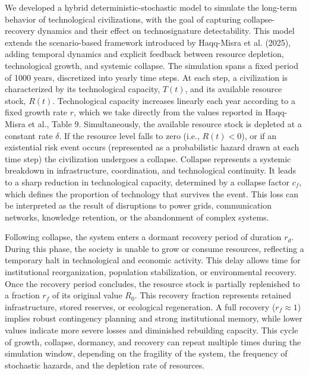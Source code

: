 We developed a hybrid deterministic-stochastic model to simulate the long-term behavior of technological civilizations, with the goal of capturing collapse-recovery dynamics and their effect on technosignature detectability. This model extends the scenario-based framework introduced by Haqq-Misra et al. (2025), adding temporal dynamics and explicit feedback between resource depletion, technological growth, and systemic collapse. The simulation spans a fixed period of 1000 years, discretized into yearly time steps. At each step, a civilization is characterized by its technological capacity, \(T(t)\), and its available resource stock, \(R(t)\). Technological capacity increases linearly each year according to a fixed growth rate \(r\), which we take directly from the values reported in Haqq-Misra et al., Table 9. Simultaneously, the available resource stock is depleted at a constant rate \(\delta\). If the resource level falls to zero (i.e., \(R(t) < 0\)), or if an existential risk event occurs (represented as a probabilistic hazard drawn at each time step) the civilization undergoes a collapse. Collapse represents a systemic breakdown in infrastructure, coordination, and technological continuity. It leads to a sharp reduction in technological capacity, determined by a collapse factor \(c_{f}\), which defines the proportion of technology that survives the event. This loss can be interpreted as the result of disruptions to power grids, communication networks, knowledge retention, or the abandonment of complex systems.

Following collapse, the system enters a dormant recovery period of duration \(r_{d}\). During this phase, the society is unable to grow or consume resources, reflecting a temporary halt in technological and economic activity. This delay allows time for institutional reorganization, population stabilization, or environmental recovery. Once the recovery period concludes, the resource stock is partially replenished to a fraction \(r_{f}\) of its original value \(R_{0}\). This recovery fraction represents retained infrastructure, stored reserves, or ecological regeneration. A full recovery (\(r_{f} \approx 1\)) implies robust contingency planning and strong institutional memory, while lower values indicate more severe losses and diminished rebuilding capacity. This cycle of growth, collapse, dormancy, and recovery can repeat multiple times during the simulation window, depending on the fragility of the system, the frequency of stochastic hazards, and the depletion rate of resources.

